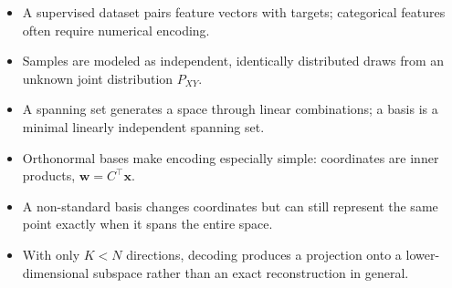 \documentclass[11pt,a4paper]{article}
\newcommand{\vect}[1]{\bm{#1}}
\begin{document}
\begin{keybox}[title=Vector Spaces and Projections --- Key Takeaways]
\begin{itemize}
  \item A supervised dataset pairs feature vectors with targets; categorical features often require numerical encoding.
  \item Samples are modeled as independent, identically distributed draws from an unknown joint distribution $P_{XY}$.
  \item A spanning set generates a space through linear combinations; a basis is a minimal linearly independent spanning set.
  \item Orthonormal bases make encoding especially simple: coordinates are inner products, $\vect w=C^\top\vect x$.
  \item A non-standard basis changes coordinates but can still represent the same point exactly when it spans the entire space.
  \item With only $K<N$ directions, decoding produces a projection onto a lower-dimensional subspace rather than an exact reconstruction in general.
\end{itemize}
\end{keybox}

\end{document}
